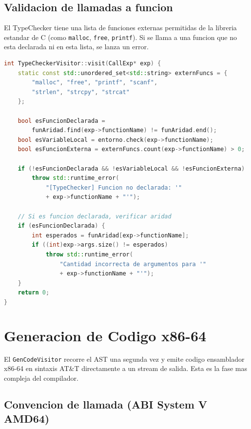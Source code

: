 \documentclass[12pt, a4paper]{article}
\begin{document}
\subsection{Validacion de llamadas a funcion}

El TypeChecker tiene una lista de funciones externas permitidas de la libreria estandar de C (como \texttt{malloc}, \texttt{free}, \texttt{printf}). Si se llama a una funcion que no esta declarada ni en esta lista, se lanza un error.

\begin{lstlisting}[language=C++, style=cppstyle, caption={Validacion de llamadas a funcion}]
int TypeCheckerVisitor::visit(CallExp* exp) {
    static const std::unordered_set<std::string> externFuncs = {
        "malloc", "free", "printf", "scanf",
        "strlen", "strcpy", "strcat"
    };

    bool esFuncionDeclarada =
        funAridad.find(exp->functionName) != funAridad.end();
    bool esVariableLocal = entorno.check(exp->functionName);
    bool esFuncionExterna = externFuncs.count(exp->functionName) > 0;

    if (!esFuncionDeclarada && !esVariableLocal && !esFuncionExterna)
        throw std::runtime_error(
            "[TypeChecker] Funcion no declarada: '"
            + exp->functionName + "'");

    // Si es funcion declarada, verificar aridad
    if (esFuncionDeclarada) {
        int esperados = funAridad[exp->functionName];
        if ((int)exp->args.size() != esperados)
            throw std::runtime_error(
                "Cantidad incorrecta de argumentos para '"
                + exp->functionName + "'");
    }
    return 0;
}
\end{lstlisting}

\newpage

\section{Generacion de Codigo x86-64}

El \texttt{GenCodeVisitor} recorre el AST una segunda vez y emite codigo ensamblador x86-64 en sintaxis AT\&T directamente a un stream de salida. Esta es la fase mas compleja del compilador.

\subsection{Convencion de llamada (ABI System V AMD64)}
\end{document}
